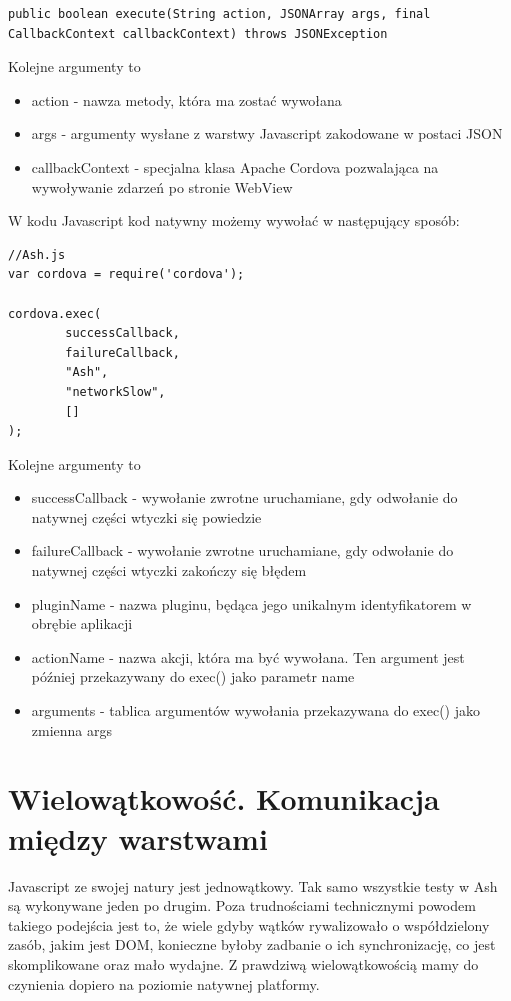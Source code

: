 \documentclass[brudnopis]{xmgr}
\begin{document}
\begin{lstlisting}
public boolean execute(String action, JSONArray args, final CallbackContext callbackContext) throws JSONException
\end{lstlisting}

Kolejne argumenty to
\begin{itemize}
  \item action - nawza metody, która ma zostać wywołana
  \item args - argumenty wysłane z warstwy Javascript zakodowane w postaci JSON
  \item callbackContext - specjalna klasa Apache Cordova pozwalająca na wywoływanie zdarzeń po stronie WebView 
\end{itemize}

W kodu Javascript kod natywny możemy wywołać w następujący sposób:

\begin{lstlisting}
//Ash.js
var cordova = require('cordova');

cordova.exec( 
        successCallback,
        failureCallback, 
        "Ash", 
        "networkSlow", 
        []
);
\end{lstlisting}

Kolejne argumenty to
\begin{itemize}
  \item successCallback - wywołanie zwrotne uruchamiane, gdy odwołanie do natywnej części wtyczki się powiedzie
  \item failureCallback - wywołanie zwrotne uruchamiane, gdy odwołanie do natywnej części wtyczki zakończy się błędem
  \item pluginName - nazwa pluginu, będąca jego unikalnym identyfikatorem w obrębie aplikacji
  \item actionName - nazwa akcji, która ma być wywołana. Ten argument jest później przekazywany do exec() jako parametr name 
\item arguments - tablica argumentów wywołania przekazywana do exec() jako zmienna args 
\end{itemize}

\section{Wielowątkowość. Komunikacja między warstwami}

Javascript ze swojej natury jest jednowątkowy. Tak samo wszystkie testy w Ash są wykonywane jeden po drugim. Poza trudnościami technicznymi powodem takiego podejścia jest to, że wiele gdyby wątków rywalizowało o współdzielony zasób, jakim jest DOM, konieczne byłoby zadbanie o ich synchronizację, co jest skomplikowane oraz mało wydajne. Z prawdziwą wielowątkowością mamy do czynienia dopiero na poziomie natywnej platformy.
\end{document}
